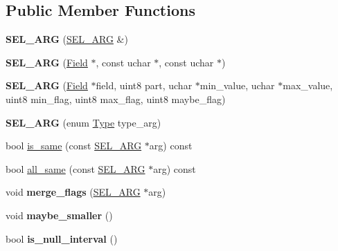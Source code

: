 \subsection*{Public Member Functions}
\begin{DoxyCompactItemize}
\item 
\mbox{\label{classSEL__ARG_af962bd7e5b8ed5214f61793b6298ed0b}} 
{\bfseries S\+E\+L\+\_\+\+A\+RG} (\mbox{\hyperlink{classSEL__ARG}{S\+E\+L\+\_\+\+A\+RG}} \&)
\item 
\mbox{\label{classSEL__ARG_a821bad39c8850c54fc8f220ad9f3746c}} 
{\bfseries S\+E\+L\+\_\+\+A\+RG} (\mbox{\hyperlink{classField}{Field}} $\ast$, const uchar $\ast$, const uchar $\ast$)
\item 
\mbox{\label{classSEL__ARG_ac9f577fab3b3c89caf81cae9bfed10f5}} 
{\bfseries S\+E\+L\+\_\+\+A\+RG} (\mbox{\hyperlink{classField}{Field}} $\ast$field, uint8 part, uchar $\ast$min\+\_\+value, uchar $\ast$max\+\_\+value, uint8 min\+\_\+flag, uint8 max\+\_\+flag, uint8 maybe\+\_\+flag)
\item 
\mbox{\label{classSEL__ARG_ab130dc29cfc6259134ab34d55d084eb4}} 
{\bfseries S\+E\+L\+\_\+\+A\+RG} (enum \mbox{\hyperlink{classSEL__ARG_ac3c2b193f810aece693ca18c6a1a9312}{Type}} type\+\_\+arg)
\item 
bool \mbox{\hyperlink{classSEL__ARG_a23667e38c8cec7a3f4916a1d63c93638}{is\+\_\+same}} (const \mbox{\hyperlink{classSEL__ARG}{S\+E\+L\+\_\+\+A\+RG}} $\ast$arg) const
\item 
bool \mbox{\hyperlink{classSEL__ARG_aef101e0a11dd01253175b280d12e2964}{all\+\_\+same}} (const \mbox{\hyperlink{classSEL__ARG}{S\+E\+L\+\_\+\+A\+RG}} $\ast$arg) const
\item 
\mbox{\label{classSEL__ARG_ad9f2cd47cc97be4670a77729e9c84ef5}} 
void {\bfseries merge\+\_\+flags} (\mbox{\hyperlink{classSEL__ARG}{S\+E\+L\+\_\+\+A\+RG}} $\ast$arg)
\item 
\mbox{\label{classSEL__ARG_a81fbf124ca8bf073756c7d13d4d94bdd}} 
void {\bfseries maybe\+\_\+smaller} ()
\item 
\mbox{\label{classSEL__ARG_a780e0fc2008e5ef2ffca14541cdd4f40}} 
bool {\bfseries is\+\_\+null\+\_\+interval} ()

\end{DoxyCompactItemize}
